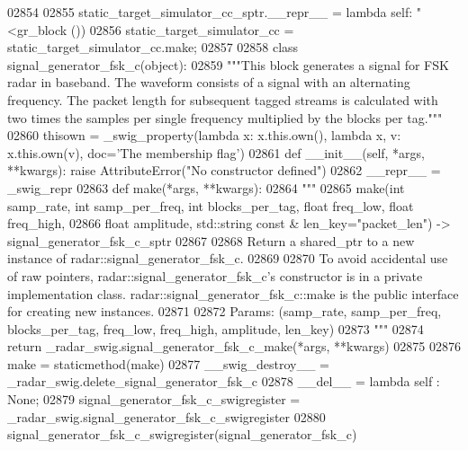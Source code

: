 \begin{DoxyCode}
{{{{{{{{{{02854 
02855 static\_target\_simulator\_cc\_sptr.\_\_repr\_\_ = \textcolor{keyword}{lambda} self: \textcolor{stringliteral}{"<gr\_block %
      ())
02856 static\_target\_simulator\_cc = static\_target\_simulator\_cc.make;
02857 
02858 \textcolor{keyword}{class }signal_generator_fsk_c(object):
02859     \textcolor{stringliteral}{"""This block generates a signal for FSK radar in baseband. The waveform consists of a signal with an
       alternating frequency. The packet length for subsequent tagged streams is calculated with two times the
       samples per single frequency multiplied by the blocks per tag."""}
02860     thisown = _swig_property(\textcolor{keyword}{lambda} x: x.this.own(), \textcolor{keyword}{lambda} x, v: x.this.own(v), doc=\textcolor{stringliteral}{'The membership flag'})
02861     \textcolor{keyword}{def }__init__(self, *args, **kwargs): \textcolor{keywordflow}{raise} AttributeError(\textcolor{stringliteral}{"No constructor defined"})
02862     \_\_repr\_\_ = \_swig\_repr
02863     \textcolor{keyword}{def }make(*args, **kwargs):
02864         \textcolor{stringliteral}{"""}
02865 \textcolor{stringliteral}{        make(int samp\_rate, int samp\_per\_freq, int blocks\_per\_tag, float freq\_low, float freq\_high, }
02866 \textcolor{stringliteral}{            float amplitude, std::string const & len\_key="packet\_len") -> signal\_generator\_fsk\_c\_sptr}
02867 \textcolor{stringliteral}{}
02868 \textcolor{stringliteral}{        Return a shared\_ptr to a new instance of radar::signal\_generator\_fsk\_c.}
02869 \textcolor{stringliteral}{}
02870 \textcolor{stringliteral}{        To avoid accidental use of raw pointers, radar::signal\_generator\_fsk\_c's constructor is in a
       private implementation class. radar::signal\_generator\_fsk\_c::make is the public interface for creating new
       instances.}
02871 \textcolor{stringliteral}{}
02872 \textcolor{stringliteral}{        Params: (samp\_rate, samp\_per\_freq, blocks\_per\_tag, freq\_low, freq\_high, amplitude, len\_key)}
02873 \textcolor{stringliteral}{        """}
02874         \textcolor{keywordflow}{return} \_radar\_swig.signal\_generator\_fsk\_c\_make(*args, **kwargs)
02875 
02876     make = staticmethod(make)
02877     \_\_swig\_destroy\_\_ = \_radar\_swig.delete\_signal\_generator\_fsk\_c
02878     \_\_del\_\_ = \textcolor{keyword}{lambda} self : \textcolor{keywordtype}{None};
02879 signal\_generator\_fsk\_c\_swigregister = \_radar\_swig.signal\_generator\_fsk\_c\_swigregister
02880 signal_generator_fsk_c_swigregister(signal\_generator\_fsk\_c)
}}}}}}}}}}}
\end{DoxyCode}
